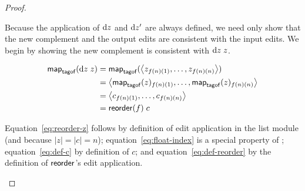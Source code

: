 \begin{proof}
{\begin{trivlist}
    Because the application of $\textrm{d} z$ and $\textrm{d} z'$ are always defined, we need
    only show that the new complement and the output edits are consistent
    with the input edits. We begin by showing the new complement is
    consistent with $\textrm{d} z\;z$.

    \begin{align}
        \mathsf{map}_{\mathsf{tagof}}(\textrm{d} z\;z)
            &= \mathsf{map}_{\mathsf{tagof}}(\left< z_{f(n)(1)},\ldots, z_{f(n)(n)}\right>)
            \label{eq:reorder-z} \\
            &= \left<\mathsf{map}_{\mathsf{tagof}}(z)_{f(n)(1)},\ldots,\mathsf{map}_{\mathsf{tagof}}(z)_{f(n)(n)}\right>
            \label{eq:float-index} \\
            &= \left< c_{f(n)(1)} ,\ldots, c_{f(n)(n)} \right>
            \label{eq:def-c} \\
            &= \mathsf{reorder}(f)\;c
            \label{eq:def-reorder}
    \end{align}

    Equation~\ref{eq:reorder-z} follows by definition of edit application in
    the list module (and because $|z|=|c|=n$); equation~\ref{eq:float-index}
    is a special property of \map; equation~\ref{eq:def-c} by
    definition of $c$; and equation~\ref{eq:def-reorder} by the definition
    of $\mathsf{reorder}$'s edit application.


\end{trivlist}}
\end{proof}

